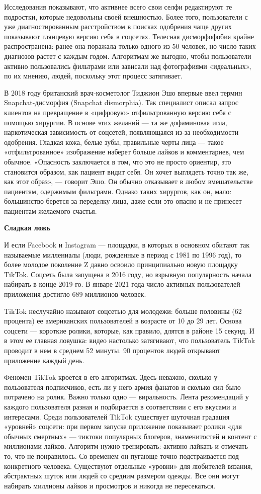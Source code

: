 Исследования показывают, что активнее всего свои селфи редактируют те подростки, которые недовольны своей внешностью. Более того, пользователи с уже диагностированным расстройством в поисках одобрения чаще других показывают глянцевую версию себя в соцсетях. Телесная дисморфофобия крайне распространена: ранее она поражала только одного из 50 человек, но число таких диагнозов растет с каждым годом. Алгоритмам же выгодно, чтобы пользователи активно пользовались фильтрами или зависали над фотографиями «идеальных», по их мнению, людей, поскольку этот процесс затягивает.

В 2018 году британский врач-косметолог Тиджион Эшо впервые ввел термин Snapchat-дисморфия (Snapchat dismorphia). Так специалист описал запрос клиентов на превращение в «цифровую» отфильтрованную версию себя с помощью хирургии. В основе этих желаний — та же дофаминовая игла, наркотическая зависимость от соцсетей, появляющаяся из-за необходимости одобрения. Гладкая кожа, белые зубы, правильные черты лица — такое «отфильтрованное» изображение наберет больше лайков и комментариев, чем обычное. «Опасность заключается в том, что это не просто ориентир, это становится образом, как пациент видит себя. Он хочет выглядеть точно так же, как этот образ», — говорит Эшо. Он обычно отказывает в любом вмешательстве пациентам, одержимым фильтрами. Однако таких хирургов, как он, мало: большинство берется за переделку лица, даже если это опасно и не принесет пациентам желаемого счастья.

\textbf{Сладкая ложь}

И если Facebook и Instagram — площадки, в которых в основном обитают так называемые миллениалы (люди, рожденные в период с 1981 по 1996 год), то более молодое поколение Z давно освоило принципиально новую площадку TikTok. Соцсеть была запущена в 2016 году, но взрывную популярность начала набирать в конце 2019-го. В январе 2021 года число активных пользователей приложения достигло 689 миллионов человек.


TikTok неслучайно называют соцсетью для молодежи: больше половины (62 процента) ее американских пользователей в возрасте от 10 до 29 лет. Основа соцсети — короткие ролики, которые, как правило, длятся в районе 15 секунд. И в этом ее главная ловушка: видео настолько затягивают, что пользователь TikTok проводит в нем в среднем 52 минуты. 90 процентов людей открывают приложение каждый день.


Феномен TikTok кроется в его алгоритмах. Здесь неважно, сколько у пользователя подписчиков, есть ли у него армия фанатов и сколько сил было потрачено на ролик. Важно только одно — виральность. Лента рекомендаций у каждого пользователя разная и подбирается в соответствии с его вкусами и интересами. Среди пользователей TikTok существует шуточная градация «уровней» соцсети: при первом запуске приложение показывает ролики «для обычных смертных» — тиктоки популярных блогеров, знаменитостей и контент с миллионами лайков. Алгоритм нужно тренировать: активно лайкать и отмечать то, что не понравилось. Со временем он пугающе точно подстраивается под конкретного человека. Существуют отдельные «уровни» для любителей вязания, абстрактных шуток или людей со средним размером одежды. Все они могут набирать миллионы лайков и просмотров и никогда не пересекаться.

